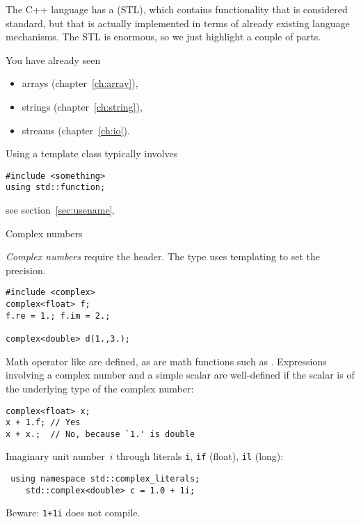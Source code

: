 
The C++ language has a  (STL),
which contains functionality that is considered standard, but that is
actually implemented in terms of already existing language
mechanisms. The STL is enormous, so we just highlight a couple of
parts.

You have already seen
\begin{itemize}
\item
  arrays (chapter~\ref{ch:array}),
\item strings (chapter~\ref{ch:string}),
\item streams (chapter~\ref{ch:io}).
\end{itemize}

Using a template class typically involves
\begin{lstlisting}
#include <something>
using std::function;
\end{lstlisting}
see section~\ref{sec:usename}.

 {Complex numbers}
\label{sec:stl-complex}

\emph{Complex numbers}
require the  header.
The  type uses templating to set the precision.
\begin{lstlisting}
#include <complex>
complex<float> f;
f.re = 1.; f.im = 2.;

complex<double> d(1.,3.);
\end{lstlisting}
Math operator like \n{+,*} are defined, as are math functions
such as .
Expressions involving a complex number and a simple scalar
are well-defined if the scalar is of the underlying type
of the complex number:
\begin{lstlisting}
complex<float> x;
x + 1.f; // Yes
x + x.;  // No, because `1.' is double
\end{lstlisting}

Imaginary unit number~$i$ through literals
\lstinline{i}, \lstinline{if} (float), \lstinline{il} (long):
\begin{lstlisting}
 using namespace std::complex_literals;
    std::complex<double> c = 1.0 + 1i;
\end{lstlisting}
Beware: \lstinline{1+1i} does not compile.

